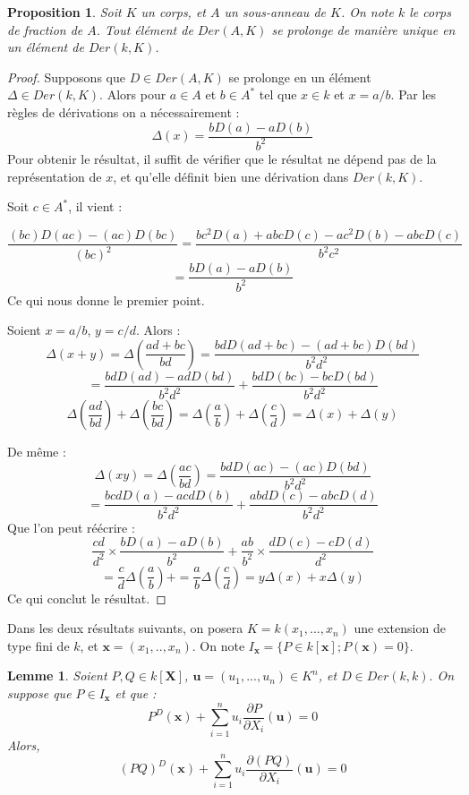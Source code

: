 \documentclass[12pt,a4paper]{report}
\newtheorem{lem}[thm]{\bf Lemme}
\newtheorem{prop}[thm]{\bf Proposition}
\begin{document}
\begin{prop}\rm
Soit $K$ un corps, et $A$ un sous-anneau de $K$. On note $k$ le corps de fraction de $A$. Tout élément de $Der(A,K)$ se prolonge de manière unique en un élément de $Der(k,K)$. 
\end{prop}

\begin{proof}
Supposons que $D\in Der(A,K)$ se prolonge en un élément $\Delta \in Der(k,K)$. Alors pour $a \in A$ et $b\in A^{*}$ tel que $x\in k$ et $x=a/b$. Par les règles de dérivations on a nécessairement : 
$$\Delta(x)=\dfrac{bD(a)-aD(b)}{b^2}$$
Pour obtenir le résultat, il suffit de vérifier que le résultat ne dépend pas de la représentation de $x$, et qu'elle définit bien une dérivation dans $Der(k,K)$. 

Soit $c\in A^{*}$, il vient : 

$$\dfrac{(bc)D(ac)-(ac)D(bc)}{(bc)^2}=\dfrac{bc^2D(a)+abcD(c)-ac^2D(b)-abcD(c)}{b^2c^2}$$
$$=\dfrac{bD(a)-aD(b)}{b^2}$$
Ce qui nous donne le premier point.

Soient $x=a/b$, $y=c/d$. Alors :
$$\Delta(x+y)=\Delta\left(\dfrac{ad+bc}{bd}\right)=\dfrac{bdD(ad+bc)-(ad+bc)D(bd)}{b^2d^2}$$
$$=\dfrac{bdD(ad)-adD(bd)}{b^2d^2}+\dfrac{bdD(bc)-bcD(bd)}{b^2d^2}$$
$$\Delta\left(\dfrac{ad}{bd}\right) +\Delta\left(\dfrac{bc}{bd}\right)=\Delta\left(\dfrac{a}{b}\right)+\Delta\left(\dfrac{c}{d}\right)=\Delta(x)+\Delta(y)$$

De même : 
$$\Delta(xy)=\Delta\left(\dfrac{ac}{bd}\right)=\dfrac{bdD(ac)-(ac)D(bd)}{b^2d^2}$$
$$=\dfrac{bcdD(a)-acdD(b)}{b^2d^2}+\dfrac{abdD(c)-abcD(d)}{b^2d^2}$$
Que l'on peut réécrire :
$$\dfrac{cd}{d^2}\times \dfrac{bD(a)-aD(b)}{b^2} +\dfrac{ab}{b^2}\times \dfrac{dD(c)-cD(d)}{d^2}$$
$$=\dfrac{c}{d}\Delta\left(\dfrac{a}{b}\right)+ =\dfrac{a}{b}\Delta\left(\dfrac{c}{d}\right)=y\Delta(x)+x\Delta(y)$$
Ce qui conclut le résultat.

\end{proof}
Dans les deux résultats suivants, on posera $K=k(x_1,...,x_n)$ une extension de type fini de $k$, et $\textbf{x}=(x_1,..,x_n)$. On note $I_{\textbf{x}}=\{P\in k[\textbf{x}]; P(\textbf{x})=0\}$.

\begin{lem}\rm
Soient $P,Q\in k[\textbf{X}]$, $\textbf{u}=(u_1,...,u_n)\in K^n$, et $D\in Der(k,k).$ On suppose que $P\in I_{\textbf{x}}$ et que :
$$P^D(\textbf{x})+\sum_{i=1}^{n}u_i\dfrac{\partial P}{\partial X_i}(\textbf{u})=0$$
Alors,
$$(PQ)^D(\textbf{x})+\sum_{i=1}^{n}u_i\dfrac{\partial (PQ)}{\partial X_i}(\textbf{u})=0$$
\end{lem}
\end{document}
